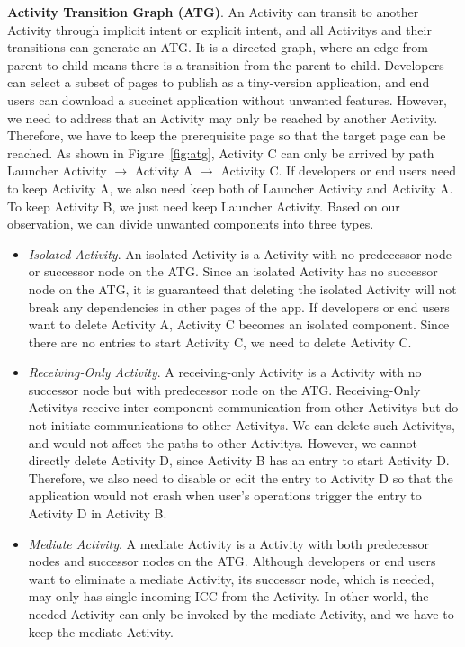 \textbf{Activity Transition Graph (ATG)}. An Activity can transit to another Activity through implicit intent or explicit intent, and all Activitys and their transitions can generate an ATG. It is a directed graph, where an edge from parent to child means there is a transition from the parent to child. Developers can select a subset of pages to publish as a tiny-version application, and end users can download a succinct application without unwanted features. However, we need to address that an Activity may only be reached by another Activity. Therefore, we have to keep the prerequisite page so that the target page can be reached. As shown in Figure~\ref{fig:atg}, Activity C can only be arrived by path Launcher Activity $\rightarrow$ Activity A $\rightarrow$ Activity C. If developers or end users need to keep Activity A, we also need keep both of Launcher Activity and Activity A. To keep Activity B, we just need keep Launcher Activity. Based on our observation, we can divide unwanted components into three types.
\begin{itemize}
	\item{\textit{Isolated Activity}. An isolated Activity is a Activity with no predecessor node or successor node on the ATG.  Since an isolated Activity has no successor node on the ATG, it is guaranteed that deleting the isolated Activity will not break any dependencies in other pages of the app. If developers or end users want to delete Activity A, Activity C becomes an isolated component. Since there are no entries to start Activity C, we need to delete Activity C.}
	
	\item{\textit{Receiving-Only Activity}. A receiving-only Activity is a Activity with no successor node but with predecessor node on the ATG. Receiving-Only Activitys receive inter-component communication from other Activitys but do not initiate communications to other Activitys. We can delete such Activitys, and would not affect the paths to other Activitys. However, we cannot directly delete Activity D, since Activity B has an entry to start Activity D. Therefore, we also need to disable or edit the entry to Activity D so that the application would not crash when user’s operations trigger the entry to Activity D in Activity B.}
	\item{\textit{Mediate Activity}. A mediate Activity is a Activity with both predecessor nodes and successor  nodes on the ATG. Although developers or end users want to eliminate a mediate Activity, its successor node, which is needed, may only has single incoming ICC from the Activity. In other world, the needed Activity can only be invoked by the mediate Activity, and we have to keep the mediate Activity.}
\end{itemize}

